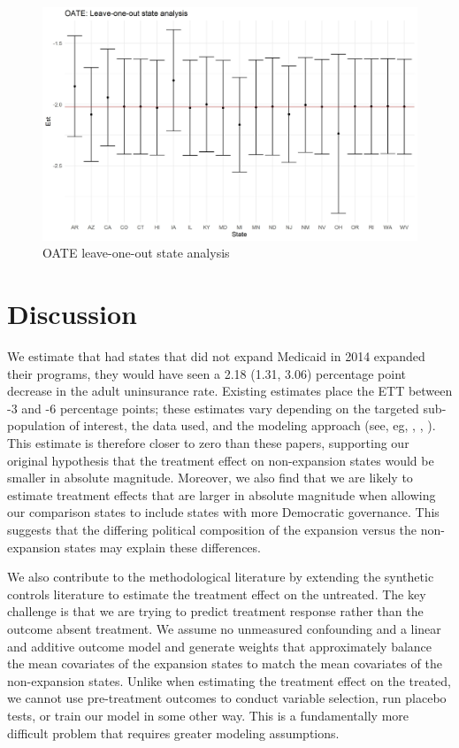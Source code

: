 \documentclass[12pt]{article}
\begin{document}
\begin{figure}
\begin{center}
    \includegraphics[scale=0.6]{images/oate-loo-state.jpeg}
    \caption{OATE leave-one-out state analysis}
    \label{loostate}
\end{center}
\end{figure}

\section{Discussion}

We estimate that had states that did not expand Medicaid in 2014 expanded their programs, they would have seen a 2.18 (1.31, 3.06) percentage point decrease in the adult uninsurance rate. Existing estimates place the ETT between -3 and -6 percentage points; these estimates vary depending on the targeted sub-population of interest, the data used, and the modeling approach (see, eg, \cite{courtemanche2017early}, \cite{kaestner2017effects}, \cite{frean2017premium}). This estimate is therefore closer to zero than these  papers, supporting our original hypothesis that the treatment effect on non-expansion states would be smaller in absolute magnitude. Moreover, we also find that we are likely to estimate treatment effects that are larger in absolute magnitude when allowing our comparison states to include states with more Democratic governance. This suggests that the differing political composition of the expansion versus the non-expansion states may explain these differences.

We also contribute to the methodological literature by extending the synthetic controls literature to estimate the treatment effect on the untreated. The key challenge is that we are trying to predict treatment response rather than the outcome absent treatment. We assume no unmeasured confounding and a linear and additive outcome model and generate weights that approximately balance the mean covariates of the expansion states to match the mean covariates of the non-expansion states. Unlike when estimating the treatment effect on the treated, we cannot use pre-treatment outcomes to conduct variable selection, run placebo tests, or train our model in some other way. This is a fundamentally more difficult problem that requires greater modeling assumptions.
\end{document}
